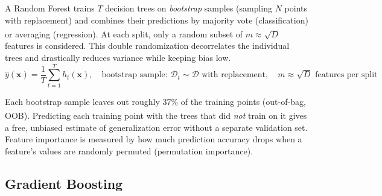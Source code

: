 \begin{tcbitemize}[ skin=sectionraster ]
    \tcbitem[title={Bagging and the Random Forest Algorithm},
             raster multicolumn=6]
    A Random Forest trains $T$ decision trees on \emph{bootstrap} samples (sampling $N$ points with replacement) and combines their predictions by majority vote (classification) or averaging (regression)\textsuperscript{\cite[][pp.~586--588]{hanDataMiningConcepts2012}}. At each split, only a random subset of $m \approx \sqrt{D}$ features is considered. This double randomization decorrelates the individual trees and drastically reduces variance while keeping bias low.
    \tcblower
    \begin{equation}
        \hat{y}(\mathbf{x}) = \frac{1}{T} \sum_{t=1}^{T} h_t(\mathbf{x}),
        \quad
        \text{bootstrap sample: } \mathcal{D}_t \sim \mathcal{D} \text{ with replacement},
        \quad
        m \approx \sqrt{D} \text{ features per split}
    \end{equation}

    \tcbitem[title={Out-of-Bag Error and Feature Importance},
             raster multicolumn=6]
    Each bootstrap sample leaves out roughly 37\% of the training points (out-of-bag, OOB)\textsuperscript{\cite[][p.588]{hanDataMiningConcepts2012}}. Predicting each training point with the trees that did \emph{not} train on it gives a free, unbiased estimate of generalization error without a separate validation set. Feature importance is measured by how much prediction accuracy drops when a feature's values are randomly permuted (permutation importance).
\end{tcbitemize}

\subsection{Gradient Boosting}

